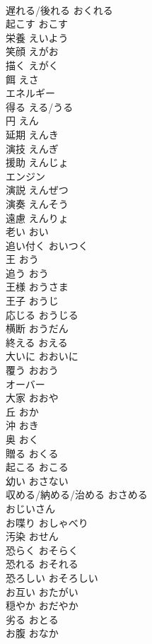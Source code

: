 \documentclass[8pt]{extreport}
\begin{document}
\begin{CJK}{UTF8}{min}
\\	遅れる/後れる	おくれる	
\\	起こす	おこす	
\\	栄養	えいよう	
\\	笑顔	えがお	
\\	描く	えがく	
\\	餌	えさ	
\\	エネルギー		
\\	得る	える/うる	
\\	円	えん	
\\	延期	えんき	
\\	演技	えんぎ	
\\	援助	えんじょ	
\\	エンジン		
\\	演説	えんぜつ	
\\	演奏	えんそう	
\\	遠慮	えんりょ	
\\	老い	おい	
\\	追い付く	おいつく	
\\	王	おう	
\\	追う	おう	
\\	王様	おうさま	
\\	王子	おうじ	
\\	応じる	おうじる	
\\	横断	おうだん	
\\	終える	おえる	
\\	大いに	おおいに	
\\	覆う	おおう	
\\	オーバー		
\\	大家	おおや	
\\	丘	おか	
\\	沖	おき	
\\	奥	おく	
\\	贈る	おくる	
\\	起こる	おこる	
\\	幼い	おさない	
\\	収める/納める/治める	おさめる	
\\	おじいさん		
\\	お喋り	おしゃべり	
\\	汚染	おせん	
\\	恐らく	おそらく	
\\	恐れる	おそれる	
\\	恐ろしい	おそろしい	
\\	お互い	おたがい	
\\	穏やか	おだやか	
\\	劣る	おとる	
\\	お腹	おなか	

\end{CJK}
\end{document}
